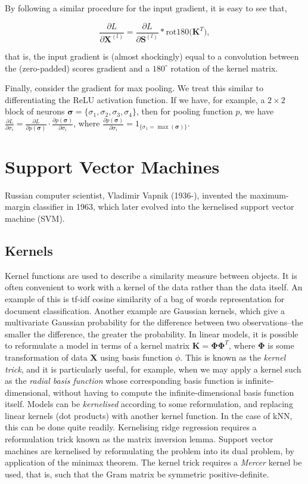 \documentclass[11pt]{amsart}
\begin{document}
By following a similar procedure for the input gradient, it is easy to see that,

$$\frac{\partial L}{\partial \mathbf{X}^{(l)}} = \frac{\partial L}{\partial \mathbf{S}^{(l)}} * \text{rot180}\big(\mathbf{K}^T\big),$$

that is, the input gradient is (almost shockingly) equal to a convolution between the (zero-padded) scores gradient and a $180^{\circ}$ rotation of the kernel matrix.

Finally, consider the gradient for max pooling. We treat this similar to differentiating the ReLU activation function. If we have, for example, a $2 \times 2$ block of neurons $\boldsymbol\sigma=\{\sigma_1, \sigma_2, \sigma_3, \sigma_4\}$, then for pooling function $p$, we have $\frac{\partial{L}}{\partial{\sigma_i}} = \frac{\partial{L}}{\partial{p(\boldsymbol\sigma)}}\cdot\frac{\partial{p(\boldsymbol\sigma)}}{\partial{\sigma_i}}$, where $\frac{\partial{p(\boldsymbol\sigma)}}{\partial{\sigma_i}} = 1_{\{\sigma_1 = \max(\boldsymbol\sigma)\}}$.

\section{Support Vector Machines}

Russian computer scientist, Vladimir Vapnik (1936-), invented the maximum-margin classifier in 1963, which later evolved into the kernelised support vector machine (SVM).

\subsection{Kernels}

Kernel functions are used to describe a similarity measure between objects. It is often convenient to work with a kernel of the data rather than the data itself. An example of this is tf-idf cosine similarity of a bag of words representation for document classification. Another example are Gaussian kernels, which give a multivariate Gaussian probability for the difference between two observations--the smaller the difference, the greater the probability. In linear models, it is possible to reformulate a model in terms of a kernel matrix $\mathbf{K} = \boldsymbol\Phi\boldsymbol\Phi^T$, where $\boldsymbol\Phi$ is some transformation of data $\mathbf{X}$ using basis function $\phi$. This is known as the \emph{kernel trick}, and it is particularly useful, for example, when we may apply a kernel such as the \emph{radial basis function} whose corresponding basis function is infinite-dimensional, without having to compute the infinite-dimensional basis function itself. Models can be \emph{kernelised} according to some reformulation, and replacing linear kernels (dot products) with another kernel function. In the case of kNN, this can be done quite readily. Kernelising ridge regression requires a reformulation trick known as the matrix inversion lemma. Support vector machines are kernelised by reformulating the problem into its dual problem, by application of the minimax theorem. The kernel trick requires a \emph{Mercer} kernel be used, that is, such that the Gram matrix be symmetric positive-definite.
\end{document}
